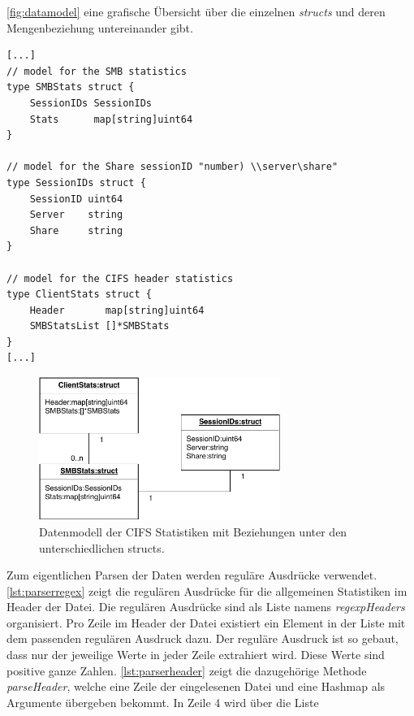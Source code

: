 \documentclass[titlepage]{report}
\begin{document}
\autoref{fig:datamodel} eine grafische Übersicht über die einzelnen
\emph{structs} und deren Mengenbeziehung untereinander gibt.
\\
\begin{minipage}{\linewidth}
\begin{lstlisting}[caption={Nicht vollständiger Auszug aus der Datei
cifs.go},label={lst:parserdata}]
[...]
// model for the SMB statistics
type SMBStats struct {
	SessionIDs SessionIDs
	Stats      map[string]uint64
}

// model for the Share sessionID "number) \\server\share"
type SessionIDs struct {
	SessionID uint64
	Server    string
	Share     string
}

// model for the CIFS header statistics
type ClientStats struct {
	Header       map[string]uint64
	SMBStatsList []*SMBStats
}
[...]
\end{lstlisting}
\end{minipage}
\begin{figure}[H]
    \centering
    \includegraphics[width=0.7\textwidth]{figures/datamodel.pdf}
    \caption{Datenmodell der CIFS Statistiken mit Beziehungen unter den
    unterschiedlichen structs.}\label{fig:datamodel}
\end{figure}
Zum eigentlichen Parsen der Daten werden reguläre Ausdrücke verwendet.
\autoref{lst:parserregex} zeigt die regulären Ausdrücke für die
allgemeinen Statistiken im Header der  Datei.
Die regulären Ausdrücke sind als Liste namens \emph{regexpHeaders}
organisiert. Pro Zeile im Header der  Datei
existiert ein Element in der Liste mit dem passenden regulären Ausdruck
dazu. Der reguläre Ausdruck ist so gebaut, dass nur der jeweilige Werte
in jeder Zeile extrahiert wird. Diese Werte sind positive ganze Zahlen.
\autoref{lst:parserheader} zeigt die dazugehörige Methode
\emph{parseHeader}, welche eine Zeile der eingelesenen Datei und eine
Hashmap als Argumente übergeben bekommt. In Zeile 4 wird über die Liste
\end{document}
